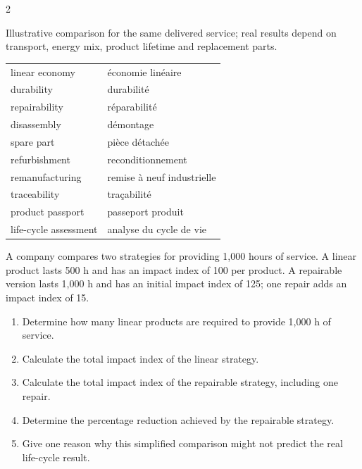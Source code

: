 \begin{multicols}{2}
\begin{tcolorbox}[title=\sffamily\bfseries Relative life-cycle impact,colback=white,colframe=ECRed]
\begin{center}
\end{center}
\footnotesize Illustrative comparison for the same delivered service; real results depend on transport,
energy mix, product lifetime and replacement parts.
\end{tcolorbox}

\begin{vocabulary}
\begin{tabularx}{\linewidth}{@{}lX@{}}
linear economy & économie linéaire\\
durability & durabilité\\
repairability & réparabilité\\
disassembly & démontage\\
spare part & pièce détachée\\
refurbishment & reconditionnement\\
remanufacturing & remise à neuf industrielle\\
traceability & traçabilité\\
product passport & passeport produit\\
life-cycle assessment & analyse du cycle de vie
\end{tabularx}
\end{vocabulary}


\begin{applicationexercise}
A company compares two strategies for providing 1,000 hours of service. A linear product lasts 500 h
and has an impact index of 100 per product. A repairable version lasts 1,000 h and has an initial
impact index of 125; one repair adds an impact index of 15.
\begin{enumerate}
\item Determine how many linear products are required to provide 1,000 h of service.
\item Calculate the total impact index of the linear strategy.
\item Calculate the total impact index of the repairable strategy, including one repair.
\item Determine the percentage reduction achieved by the repairable strategy.
\item Give one reason why this simplified comparison might not predict the real life-cycle result.
\end{enumerate}
\end{applicationexercise}


\end{multicols}
